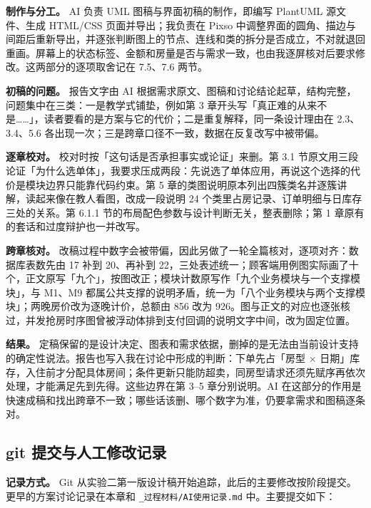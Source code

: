 \textbf{制作与分工。} AI 负责 UML 图稿与界面初稿的制作，即编写 PlantUML 源文件、生成 HTML/CSS 页面并导出；我负责在 Pixso 中调整界面的圆角、描边与间距后重新导出，并逐张判断图上的节点、连线和类的拆分是否成立，不对就退回重画。屏幕上的状态标签、金额和房量是否与需求一致，也由我逐屏核对后要求修改。这两部分的逐项取舍记在 7.5、7.6 两节。

\textbf{初稿的问题。} 报告文字由 AI 根据需求原文、图稿和讨论结论起草，结构完整，问题集中在三类：一是教学式铺垫，例如第 3 章开头写「真正难的从来不是……」，读者要看的是方案与它的代价；二是重复解释，同一条设计理由在 2.3、3.4、5.6 各出现一次；三是跨章口径不一致，数据在反复改写中被带偏。

\textbf{逐章校对。} 校对时按「这句话是否承担事实或论证」来删。第 3.1 节原文用三段论证「为什么选单体」，我要求压成两段：先说选了单体应用，再说这个选择的代价是模块边界只能靠代码约束。第 5 章的类图说明原本列出四簇类名并逐簇讲解，读起来像在教人看图，改成一段说明 24 个类里占房记录、订单明细与日库存三处的关系。第 6.1.1 节的布局配色参数与设计判断无关，整表删除；第 1 章原有的套话和过度辩护也一并改写。

\textbf{跨章核对。} 改稿过程中数字会被带偏，因此另做了一轮全篇核对，逐项对齐：数据库表数先由 17 补到 20、再补到 22，三处表述统一；顾客端用例图实际画了十个，正文原写「九个」，按图改正；模块计数原写作「九个业务模块与一个支撑模块」，与 M1、M9 都属公共支撑的说明矛盾，统一为「八个业务模块与两个支撑模块」；两晚房价改为逐晚计价，总额由 856 改为 926。图与正文的对应也逐张核过，并发抢房时序图曾被浮动体排到支付回调的说明文字中间，改为固定位置。

\textbf{结果。} 定稿保留的是设计决定、图表和需求依据，删掉的是无法由当前设计支持的确定性说法。报告也写入我在讨论中形成的判断：下单先占「房型 $\times$ 日期」库存，入住前才分配具体房间；条件更新只能防超卖，同房型请求还须先赋序再依次处理，才能满足先到先得。这些边界在第 3--5 章分别说明。AI 在这部分的作用是快速成稿和找出跨章不一致；哪些话该删、哪个数字为准，仍要拿需求和图稿逐条对。

\subsection{git 提交与人工修改记录}

\textbf{记录方式。} Git 从实验二第一版设计稿开始追踪，此后的主要修改按阶段提交。更早的方案讨论记录在本章和 \texttt{\_过程材料/AI使用记录.md} 中。主要提交如下：

